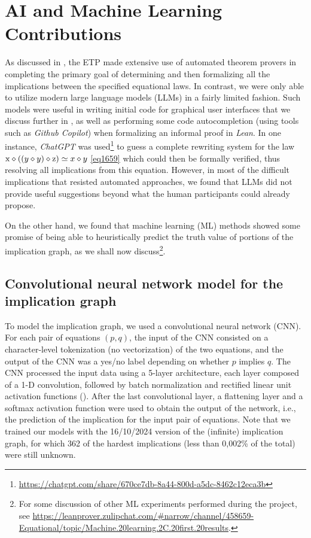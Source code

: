 \section{AI and Machine Learning Contributions}\label{ml-sec}

As discussed in , the ETP made extensive use of automated theorem provers in completing the primary goal of determining and then formalizing all the implications between the specified equational laws.  In contrast, we were only able to utilize modern large language models (LLMs) in a fairly limited fashion.  Such models were useful in writing initial code for graphical user interfaces that we discuss further in , as well as performing some code autocompletion (using tools such as \emph{Github Copilot}) when formalizing an informal proof in \emph{Lean}.  In one instance, \emph{ChatGPT} was used\footnote{\url{https://chatgpt.com/share/670ce7db-8a44-800d-a5dc-8462c12eca3b}} to guess a complete rewriting system for the law $\mathrm{x} \diamond ((y \diamond y) \diamond \mathrm{z}) \simeq x \diamond y$ \eqref{eq1659} which could then be formally verified, thus resolving all implications from this equation. However, in most of the difficult implications that resisted automated approaches, we found that LLMs did not provide useful suggestions beyond what the human participants could already propose.

On the other hand, we found that machine learning (ML) methods showed some promise of being able to heuristically predict the truth value of portions of the implication graph, as we shall now discuss\footnote{For some discussion of other ML experiments performed during the project, see \url{https://leanprover.zulipchat.com/\#narrow/channel/458659-Equational/topic/Machine.20learning.2C.20first.20results}.}.

\subsection{Convolutional neural network model for the implication graph}

To model the implication graph, we used a convolutional neural network (CNN). For each pair of equations $(p,q)$, the input of the CNN consisted on a character-level tokenization (no vectorization) of the two equations, and the output of the CNN was a yes/no label depending on whether $p$ implies $q$. The CNN processed the input data using a 5-layer architecture, each layer composed of a 1-D convolution, followed by batch normalization and rectified linear unit activation functions (\cite{Goodfellow-et-al-2016}). After the last convolutional layer, a flattening layer and a softmax activation function were used to obtain the output of the network, i.e., the prediction of the implication for the input pair of equations. Note that we trained our models with the 16/10/2024 version of the (infinite) implication graph, for which 362 of the hardest implications (less than 0,002\% of the total) were still unknown.

